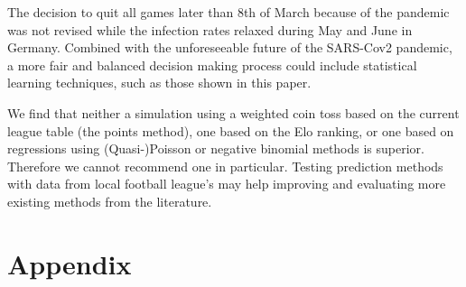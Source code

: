 \documentclass[12pt,a4paper]{article}
\begin{document}
The decision to quit all games later than 8th of March because of the
pandemic was not revised while the infection rates relaxed during May
and June in Germany. Combined with the unforeseeable future of the
SARS-Cov2 pandemic, a more fair and balanced decision making process
could include statistical learning techniques, such as those shown in
this paper.

We find that neither a simulation using a weighted coin toss based on
the current league table (the points method), one based on the Elo
ranking, or one based on regressions using (Quasi-)Poisson or negative
binomial methods is superior. Therefore we cannot recommend one in
particular. Testing prediction methods with data from local football
league's may help improving and evaluating more existing methods from
the literature.

\newpage

\printbibliography

\newpage

\hypertarget{appendix}{%
\section{Appendix}\label{appendix}}
\end{document}
